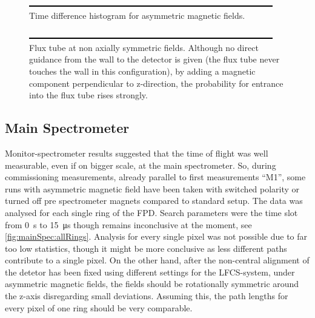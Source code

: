   \begin{figure}
	\label{fig:monSpec:timeDifferences asymmetric magnetic field}
	\caption[Time difference histogram]{Time difference histogram for asymmetric magnetic fields.}
  	\includegraphics{graphics/dummy.eps}
  \end{figure}
  
  \begin{figure}
	\label{fig:monSpec:timeDifferences non axially symmetric magnetic field}
	\caption[Non-axially symmetric magnetic flux tube monitor spectrometer]{Flux tube at non axially symmetric fields. Although no direct guidance from the wall to the detector is given (the flux tube never touches the wall in this configuration), by adding a magnetic component perpendicular to z-direction, the probability for entrance into the flux tube rises strongly.}
  	\includegraphics{graphics/dummy.eps}
  \end{figure}  
  \subsection{Main Spectrometer}
  \label{ch:Analysis:sec:Monitor Spectrometer Measurements:subsec:Main Spectrometer}
  
  Monitor-spectrometer results suggested that the time of flight was well measurable, even if on bigger scale, at the main spectrometer. So, during commissioning measurements, already parallel to first measurements ``M1'', some runs with asymmetric magnetic field have been taken with switched polarity or turned off pre spectrometer magnets compared to standard setup.
  The data was analysed for each single ring of the FPD. Search parameters were the time slot from \SI{0}{\second} to \SI{15}{\micro\second} though remains inconclusive at the moment, see \ref{fig:mainSpec:allRings}. Analysis for every single pixel was not possible due to far too low statistics, though it might be more conclusive as less different paths contribute to a single pixel. On the other hand, after the non-central alignment of the detetor has been fixed using different settings for the LFCS-system, under asymmetric magnetic fields, the fields should be rotationally symmetric around the z-axis disregarding small deviations. Assuming this, the path lengths for every pixel of one ring should be very comparable.
  
